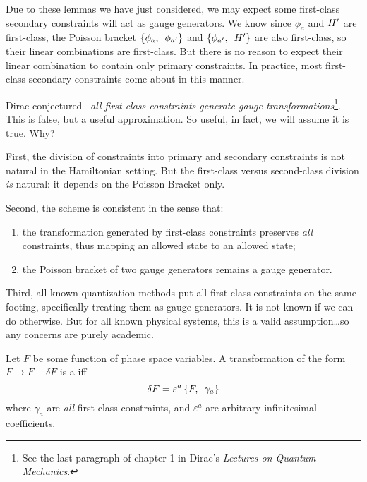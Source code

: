 Due to these lemmas we have just considered, we may expect some
first-class secondary constraints will act as gauge generators. We know
since $\phi_{a}$ and $H'$ are first-class, the
Poisson bracket $\left\{\phi_{a},\enspace\phi_{a'}\right\}$ and
$\left\{\phi_{a'},\enspace H'\right\}$ are also
first-class, so their linear combinations are first-class. But there is
no reason to expect their linear combination to contain only primary
constraints. In practice, most first-class secondary constraints come
about in this manner.

Dirac conjectured~\cite{dirac1964} \emph{all first-class constraints generate
gauge transformations}\footnote{See the last paragraph of chapter 1 in
  Dirac's \emph{Lectures on Quantum Mechanics}.}.
This is false, but a useful approximation. So useful, in fact, we will
assume it is true. Why?

First, the division of constraints into primary and secondary
constraints is not natural in the Hamiltonian setting. But the
first-class versus second-class division \emph{is} natural: it depends
on the Poisson Bracket only.

Second, the scheme is consistent in the sense that:
\begin{enumerate}
\item the transformation generated by first-class constraints preserves
  \emph{all} constraints, thus mapping an allowed state to an allowed
  state;
\item the Poisson bracket of two gauge generators remains a gauge
  generator.
\end{enumerate}

Third, all known quantization methods put all first-class constraints on
the same footing, specifically treating them as gauge generators. It is
not known if we can do otherwise. But for all known physical systems,
this is a valid assumption\dots so any concerns are purely academic.

\begin{defn}
Let $F$ be some function of phase space variables. A transformation of
the form $F\to F + \delta F$ is a  iff
\begin{equation}
\delta F = \varepsilon^{a}\left\{F,\enspace\gamma_{a}\right\}
\end{equation}
where $\gamma_{a}$ are \emph{all} first-class constraints, and
$\varepsilon^{a}$ are arbitrary infinitesimal coefficients.
\end{defn}

